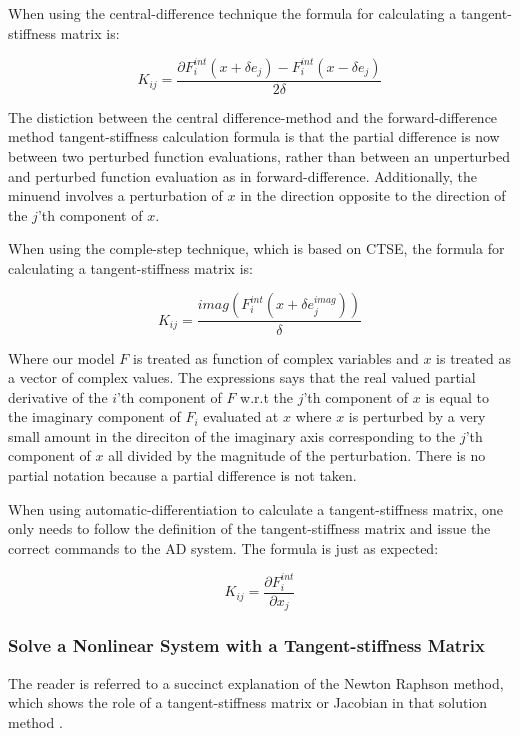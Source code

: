 \documentclass[preprint,12pt]{elsarticle}
\begin{document}
When using the central-difference technique the formula for calculating a tangent-stiffness matrix
is:

\begin{equation} K_{ij} = \frac{\partial F_i^{int}(x + \delta e_j) - F_i^{int}(x - \delta
e_j)}{2\delta} \end{equation}

The distiction between the central difference-method and the forward-difference method
tangent-stiffness calculation formula is that the partial difference is now between two perturbed
function evaluations, rather than between an unperturbed and perturbed function evaluation as in
forward-difference. Additionally, the minuend involves a perturbation of $x$ in the direction opposite to
the direction of the $j$'th component of $x$. 

When using the comple-step technique, which is based on CTSE, the formula for calculating a
tangent-stiffness matrix is:

\begin{equation} K_{ij} = \frac{imag(F_i^{int}(x + \delta e_j^{imag}))}{\delta} \end{equation}

Where our model $F$ is treated as function of complex variables and $x$ is treated as a vector of
complex values. The expressions says that the real valued partial derivative of the $i$'th component of $F$
w.r.t the $j$'th component of $x$ is equal to the imaginary component of $F_i$ evaluated at $x$
where $x$ is perturbed by a very small amount in the direciton of the imaginary axis corresponding
to the $j$'th component of $x$ all divided by the magnitude of the perturbation. There is no partial
notation because a partial difference is not taken.

When using automatic-differentiation to calculate a tangent-stiffness matrix, one only needs to
follow the definition of the tangent-stiffness matrix and issue the correct commands to the AD
system. The formula is just as expected:

\begin{equation} K_{ij} = \frac{\partial F_i^{int}}{\partial x_j} \end{equation}

\subsubsection{Solve a Nonlinear System with a Tangent-stiffness Matrix} \label{solve_a_system}
The reader is referred to a succinct explanation of the Newton Raphson method, which shows the
role of a tangent-stiffness matrix or Jacobian in that solution method \cite[chap.
13]{young2009}. 
\end{document}

